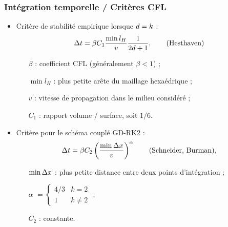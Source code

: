 \begin{frame}
\frametitle{Intégration temporelle / Critères CFL}
\vfill
\begin{itemize}
\item Critère de stabilité empirique lorsque $d = k$ :
\begin{align*}
	\Delta t = \beta C_1 \frac{\min l_H}{v} \frac{1}{2 d + 1} ,
	\tag{Hesthaven}
\end{align*}
\begin{itemize}
\item [$\beta$] : coefficient CFL (généralement $\beta < 1$) ;
\item [$\min l_H$] : plus petite arête du maillage hexaédrique ;
\item [$v$] : vitesse de propagation dans le milieu considéré ;
\item [$C_1$] : rapport volume / surface, soit $1/6$.
\end{itemize}
\vfill
\item Critère pour le schéma couplé GD-RK$2$ :
\begin{align*}
	\Delta t = \beta C_2 \left(\frac{\min \Delta x}{v}\right)^{\alpha}
	\tag{Schneider, Burman} ,
\end{align*}
\begin{itemize}
\item [$\min \Delta x$] : plus petite distance entre deux points d'intégration ;
\item [$\alpha$] $= \begin{cases} 4/3 & k = 2 \\ 1 & k \ne 2\end{cases}$ ;
\item [$C_2$] : constante.
\end{itemize}
\end{itemize}
\vfill
\end{frame}

